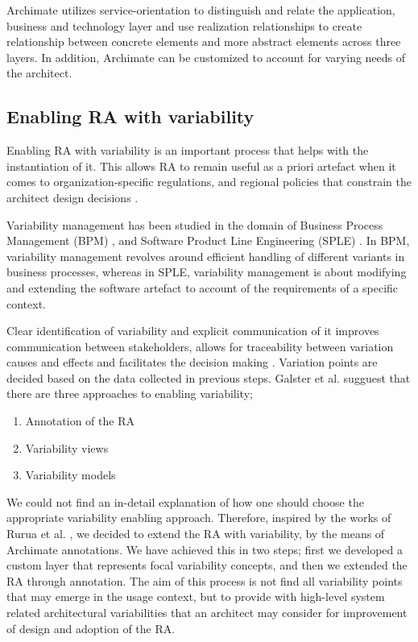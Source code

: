\documentclass[review]{elsarticle}
\begin{document}
Archimate utilizes service-orientation to distinguish and relate the application, business and technology layer and use realization relationships to create relationship between concrete elements and more abstract elements across three layers. In addition, Archimate can be customized to account for varying needs of the architect.

\subsection{Enabling RA with variability}

Enabling RA with variability is an important process that helps with the instantiation of it.
This allows RA to remain useful as a priori artefact when it comes to organization-specific regulations, and regional policies that constrain the architect design decisions \cite{rurua2019representing}.

Variability management has been studied in the domain of Business Process Management (BPM) \cite{la2009questionnaire,rosemann2007configurable,hallerbach2010capturing}, and Software Product Line Engineering (SPLE) \cite{pohl2005software,chen2011systematic,schmid2004customizable,svahnberg2005taxonomy,sinnema2006covamof}. In BPM, variability management revolves around efficient handling of different variants in business processes, whereas in SPLE, variability management is about modifying and extending the software artefact to account of the requirements of a specific context.

Clear identification of variability and explicit communication of it improves communication between stakeholders, allows for traceability between variation causes and effects and facilitates the decision making \cite{czarnecki2012cool}. Variation points are decided based on the data collected in previous steps. Galster et al. \cite{galster2011empirically} sugguest that there are three approaches to enabling variability;

\begin{enumerate}
    \item Annotation of the RA
    \item Variability views
    \item Variability models
\end{enumerate}

We could not find an in-detail explanation of how one should choose the appropriate variability enabling approach. Therefore, inspired by the works of Rurua et al. \cite{rurua2019representing}, we decided to extend the RA with variability, by the means of Archimate annotations. We have achieved this in two steps; first we developed a custom layer that represents focal variability concepts, and then we extended the RA through annotation. The aim of this process is not find all variability points that may emerge in the usage context, but to provide with high-level system related architectural variabilities that an architect may consider for improvement of design and adoption of the RA.
\end{document}

